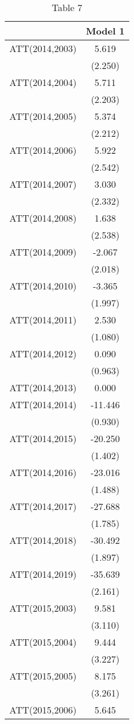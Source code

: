 \begin{table}

\caption{Table 7}
\centering
\begin{tabular}[t]{lc}
\toprule
  & Model 1\\
\midrule
ATT(2014,2003) & 5.619\\
 & (2.250)\\
ATT(2014,2004) & 5.711\\
 & (2.203)\\
ATT(2014,2005) & 5.374\\
 & (2.212)\\
ATT(2014,2006) & 5.922\\
 & (2.542)\\
ATT(2014,2007) & 3.030\\
 & (2.332)\\
ATT(2014,2008) & 1.638\\
 & (2.538)\\
ATT(2014,2009) & -2.067\\
 & (2.018)\\
ATT(2014,2010) & -3.365\\
 & (1.997)\\
ATT(2014,2011) & 2.530\\
 & (1.080)\\
ATT(2014,2012) & 0.090\\
 & (0.963)\\
ATT(2014,2013) & 0.000\\
ATT(2014,2014) & -11.446\\
 & (0.930)\\
ATT(2014,2015) & -20.250\\
 & (1.402)\\
ATT(2014,2016) & -23.016\\
 & (1.488)\\
ATT(2014,2017) & -27.688\\
 & (1.785)\\
ATT(2014,2018) & -30.492\\
 & (1.897)\\
ATT(2014,2019) & -35.639\\
 & (2.161)\\
ATT(2015,2003) & 9.581\\
 & (3.110)\\
ATT(2015,2004) & 9.444\\
 & \vphantom{1} (3.227)\\
ATT(2015,2005) & 8.175\\
 & (3.261)\\
ATT(2015,2006) & 5.645\\

\end{tabular}
\end{table}
